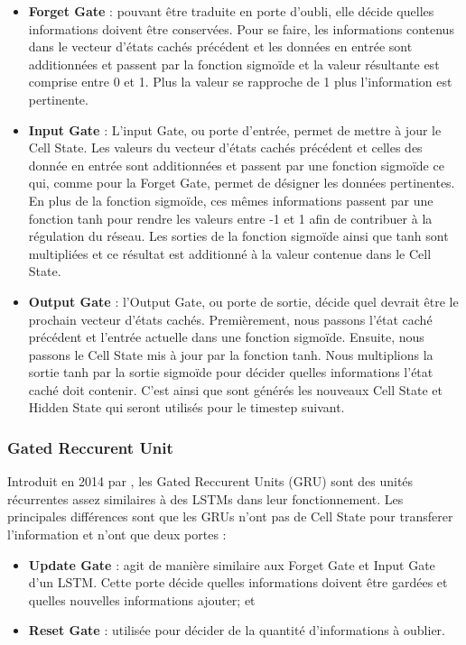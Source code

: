 \begin{itemize}
    \item \textbf{Forget Gate} : pouvant être traduite en porte d'oubli, elle décide quelles informations doivent être conservées. Pour se faire, les informations contenus dans le vecteur d'états cachés précédent et les données en entrée sont additionnées et passent par la fonction sigmoïde et la valeur résultante est comprise entre 0 et 1. Plus la valeur se rapproche de 1 plus l'information est pertinente.\\
    \item \textbf{Input Gate} : L'input Gate, ou porte d'entrée, permet de mettre à jour le Cell State. Les valeurs du vecteur d'états cachés précédent et celles des donnée en entrée sont additionnées et passent par une fonction sigmoïde ce qui, comme pour la Forget Gate, permet de désigner les données pertinentes. En plus de la fonction sigmoïde, ces mêmes informations passent par une fonction tanh pour rendre les valeurs entre -1 et 1 afin de contribuer à la régulation du réseau. Les sorties de la fonction sigmoïde ainsi que tanh sont multipliées et ce résultat est additionné à la valeur contenue dans le Cell State.\\
    \item \textbf{Output Gate} : l'Output Gate, ou porte de sortie, décide quel devrait être le prochain vecteur d'états cachés. Premièrement, nous passons l'état caché précédent et l'entrée actuelle dans une fonction sigmoïde. Ensuite, nous passons le Cell State mis à jour par la fonction tanh. Nous multiplions la sortie tanh par la sortie sigmoïde pour décider quelles informations l'état caché doit contenir. C'est ainsi que sont générés les nouveaux Cell State et Hidden State qui seront utilisés pour le timestep suivant.
\end{itemize}
        
\subsubsection{Gated Reccurent Unit}
Introduit en 2014 par \cite{GRUpaper}, les Gated Reccurent Units (GRU) sont des unités récurrentes assez similaires à des LSTMs dans leur fonctionnement. Les principales différences sont que les GRUs n'ont pas de Cell State pour transferer l'information et n'ont que deux portes \cite{lstmgates} : 
\begin{itemize}
    \item \textbf{Update Gate} : agit de manière similaire aux Forget Gate et Input Gate d’un LSTM. Cette porte décide quelles informations doivent être gardées et quelles nouvelles informations ajouter; et
    \item \textbf{Reset Gate} : utilisée pour décider de la quantité d'informations à oublier.\\
\end{itemize}

